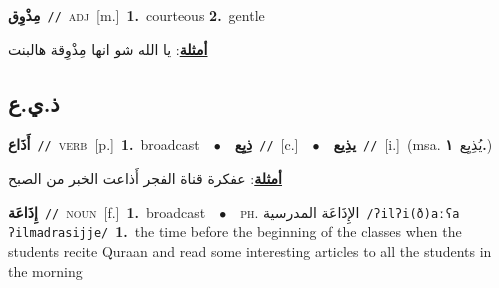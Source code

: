 \documentclass[10pt,a4paper,twoside]{article} %
\begin{document}
\begin{multicols}{2}
{\setlength\topsep{0pt}\textbf{\foreignlanguage{arabic}{مِذْوِق}}\ {\color{gray}\texttt{//}\color{black}}\ \textsc{adj}\ [m.]\ \textbf{1.}~courteous  \textbf{2.}~gentle\  \begin{flushright}\color{gray}\foreignlanguage{arabic}{\textbf{\underline{\foreignlanguage{arabic}{أمثلة}}}: يا الله شو انها مِذْوِقة هالبنت}\end{flushright}\color{black}} \vspace{2mm}

\vspace{-3mm}
\subsection*{\color{blue}\foreignlanguage{arabic}{ذ.ي.ع}\color{blue}{}} 

{\setlength\topsep{0pt}\textbf{\foreignlanguage{arabic}{أَذَاع}}\ {\color{gray}\texttt{//}\color{black}}\ \textsc{verb}\ [p.]\ \textbf{1.}~broadcast\ \ $\bullet$\ \ \setlength\topsep{0pt}\textbf{\foreignlanguage{arabic}{ذِيِع}}\ {\color{gray}\texttt{//}\color{black}}\ [c.]\ \ $\bullet$\ \ \setlength\topsep{0pt}\textbf{\foreignlanguage{arabic}{يذِيع}}\ {\color{gray}\texttt{//}\color{black}}\ [i.]\ \color{gray}(msa. \foreignlanguage{arabic}{يُذِيِع}~\foreignlanguage{arabic}{\textbf{١.}})\color{black}\  \begin{flushright}\color{gray}\foreignlanguage{arabic}{\textbf{\underline{\foreignlanguage{arabic}{أمثلة}}}: عفكرة قناة الفجر أَذاعت الخبر من الصبح}\end{flushright}\color{black}} \vspace{2mm}

{\setlength\topsep{0pt}\textbf{\foreignlanguage{arabic}{إِذَاعَة}}\ {\color{gray}\texttt{//}\color{black}}\ \textsc{noun}\ [f.]\ \textbf{1.}~broadcast\ \ $\bullet$\ \ \textsc{ph.} \color{gray} \foreignlanguage{arabic}{الإِذَاعَة المدرسية}\color{black}\ {\color{gray}\texttt{/{\sffamily ʔilʔi(ð)aːʕa ʔilmadrasijje}/}\color{black}}\ \textbf{1.}~the time before the beginning of the classes when the students recite Quraan and read some interesting articles to all the students in the morning\ } \vspace{2mm}


\end{multicols}
\end{document}
